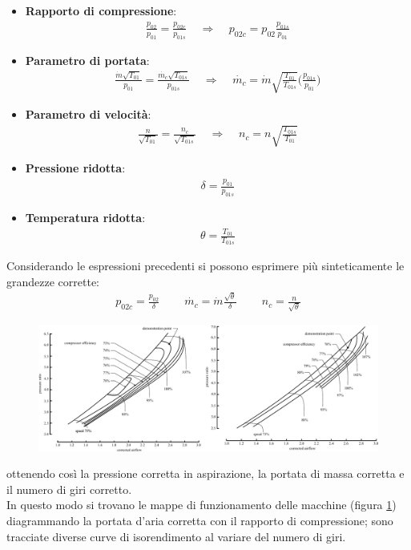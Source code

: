 \begin{itemize}
	\item \textbf{Rapporto di compressione}:
	\begin{align*}
	\frac{p_{02}}{p_{01}} = \frac{p_{02c}}{p_{01s}} \;\;\;\; \Rightarrow \;\;\;\; p_{02c} = p_{02}\frac{p_{01s}}{p_{01}}
	\end{align*}
	\item \textbf{Parametro di portata}:
	\begin{align*}
	\frac{\dot{m}\sqrt{T_{01}}}{p_{01}}=\frac{\dot{m_c}\sqrt{T_{01s}}}{p_{01s}} \;\;\;\; \Rightarrow \;\;\;\; \dot{m_c} = \dot{m} \sqrt{\frac{T_{01}}{T_{01s}}} \bigg(\frac{p_{01s}}{p_{01}} \bigg)
	\end{align*}
	\item \textbf{Parametro di velocità}:
	\begin{align*}
	\frac{n}{\sqrt{T_{01}}}=\frac{n_c}{\sqrt{T_{01s}}} \;\;\;\; \Rightarrow \;\;\;\; n_c = n \sqrt{\frac{T_{01s}}{T_{01}}}
	\end{align*}
	\item \textbf{Pressione ridotta}:
	\begin{align*}
	\delta = \frac{p_{01}}{p_{01s}}
	\end{align*}
	\item \textbf{Temperatura ridotta}:
	\begin{align*}
	\theta = \frac{T_{01}}{T_{01s}}
	\end{align*}
\end{itemize}
Considerando le espressioni precedenti si possono esprimere più sinteticamente le grandezze corrette:
\begin{align*}
p_{02c} = \frac{p_{02}}{\delta} \;\;\;\;\;\;\;\; \dot{m_c}= \dot{m} \frac{\sqrt{\theta}}{\delta} \;\;\;\;\;\;\;\; n_c = \frac{n}{\sqrt{\theta}}
\end{align*}
\begin{figure}
\centering
  \includegraphics[width=\textwidth]{fig/CompMaps.pdf}
\caption{}
\label{fig:compMaps}
\end{figure}
ottenendo così la pressione corretta in aspirazione, la portata di massa corretta e il numero di giri corretto.\\
In questo modo si trovano le mappe di funzionamento delle macchine (figura \ref{fig:compMaps}) diagrammando la portata d'aria corretta con il rapporto di compressione; sono tracciate diverse curve di isorendimento al variare del numero di giri.

